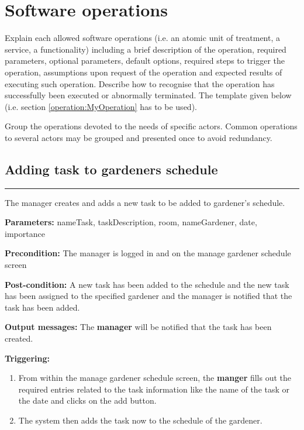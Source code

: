 \chapter{Software operations}
\label{chap:soptware_operations}


Explain each allowed software operations (i.e. an atomic unit of treatment, a service, a functionality) including a brief description of the operation, required parameters, optional parameters, default options, required steps to trigger the operation, assumptions upon request of the operation and expected results of executing such operation.
Describe how to recognise that the operation has successfully been executed or
abnormally terminated. The template given below (i.e. section \ref{operation:MyOperation} has to be used).

Group the operations devoted to the needs of specific actors. Common
operations to several actors may be grouped and presented once to avoid redundancy.


\section{Adding task to gardeners schedule}

\hrule
\hfill
\vspace{0.5cm}
\label{operation:addTaskGardener}

The manager creates and adds a new task to be added to gardener's schedule.
\begin{description}

\item \textbf{Parameters:} nameTask, taskDescription, room, nameGardener, date,
importance
\item \textbf{Precondition:} The manager is logged in and on the manage gardener
schedule screen
\item \textbf{Post-condition:} A new task has been added to the schedule and the
new task has been assigned to the specified gardener and the manager is
notified that the task has been added.
\item \textbf{Output messages:} The \textbf{manager} will be notified that the
task has been created.

\item \textbf{Triggering:}
\begin{enumerate}
\item From within the manage gardener schedule screen, the \textbf{manger} fills
out the required entries related to the task information like the name of the task or
the date and clicks on the add button.
\item The system then adds the task now to the schedule of the gardener.
\end{enumerate}
\end{description}
